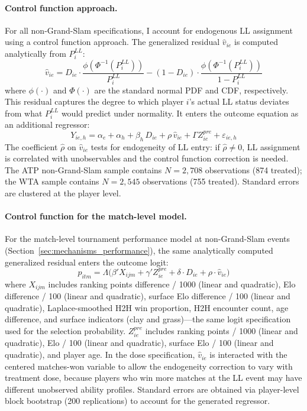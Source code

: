 \paragraph{Control function approach.} For all non-Grand-Slam specifications, I account for endogenous LL assignment using a control function approach. The generalized residual $\hat{v}_{ie}$ is computed analytically from $P_i^{LL}$:
\[
\hat{v}_{ie} = D_{ie} \cdot \frac{\phi(\Phi^{-1}(P_i^{LL}))}{P_i^{LL}} - (1 - D_{ie}) \cdot \frac{\phi(\Phi^{-1}(P_i^{LL}))}{1 - P_i^{LL}}
\]
where $\phi(\cdot)$ and $\Phi(\cdot)$ are the standard normal PDF and CDF, respectively. This residual captures the degree to which player $i$'s actual LL status deviates from what $P_i^{LL}$ would predict under normality. It enters the outcome equation as an additional regressor:
\begin{equation}
\label{eq:cf_dynamic}
Y_{ie,h} = \alpha_e + \alpha_h + \beta_h \, D_{ie} + \rho \, \hat{v}_{ie} + \Gamma Z^{pre}_{ie} + \varepsilon_{ie,h}
\end{equation}
The coefficient $\hat{\rho}$ on $\hat{v}_{ie}$ tests for endogeneity of LL entry: if $\hat{\rho} \neq 0$, LL assignment is correlated with unobservables and the control function correction is needed. The ATP non-Grand-Slam sample contains $N = 2{,}708$ observations (874 treated); the WTA sample contains $N = 2{,}545$ observations (755 treated). Standard errors are clustered at the player level.

\paragraph{Control function for the match-level model.} For the match-level tournament performance model at non-Grand-Slam events (Section~\ref{sec:mechanisms_performance}), the same analytically computed generalized residual enters the outcome logit:
\begin{equation}
\label{eq:match_logit_cf}
p_{itm} = \Lambda\bigl(\beta' X_{ijm} + \gamma' Z^{pre}_{ie} + \delta \cdot D_{ie} + \rho \cdot \hat{v}_{ie}\bigr)
\end{equation}
where $X_{ijm}$ includes ranking points difference / 1000 (linear and quadratic), Elo difference / 100 (linear and quadratic), surface Elo difference / 100 (linear and quadratic), Laplace-smoothed H2H win proportion, H2H encounter count, age difference, and surface indicators (clay and grass)---the same logit specification used for the selection probability. $Z^{pre}_{ie}$ includes ranking points / 1000 (linear and quadratic), Elo / 100 (linear and quadratic), surface Elo / 100 (linear and quadratic), and player age. In the dose specification, $\hat{v}_{ie}$ is interacted with the centered matches-won variable to allow the endogeneity correction to vary with treatment dose, because players who win more matches at the LL event may have different unobserved ability profiles. Standard errors are obtained via player-level block bootstrap (200 replications) to account for the generated regressor.
